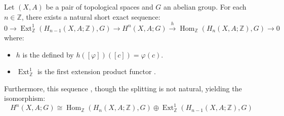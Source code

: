 \begin{theorem} \label{theorem:universal_coefficient_theorem_for_singular_cohomology_of_topological_spaces_with_coefficients_in_abelian_groups}
Let $(X, A)$ be a pair of topological spaces and $G$ an abelian group. For each $n \in \mathbb{Z}$, there exists a natural short exact sequence:
$$0 \to \operatorname{Ext}_{\mathbb{Z}}^1(H_{n-1}(X, A; \mathbb{Z}), G) \to H^n(X, A; G) \xrightarrow{h} \operatorname{Hom}_{\mathbb{Z}}(H_n(X, A; \mathbb{Z}), G) \to 0$$
where:
\begin{itemize}
    \item $h$ is the  defined by $h([\varphi])([c]) = \varphi(c)$.
    \item $\operatorname{Ext}_{\mathbb{Z}}^1$ is the first extension product functor .
\end{itemize}
Furthermore, this sequence , though the splitting is not natural, yielding the isomorphism:
$$H^n(X, A; G) \cong \operatorname{Hom}_{\mathbb{Z}}(H_n(X, A; \mathbb{Z}), G) \oplus \operatorname{Ext}_{\mathbb{Z}}^1(H_{n-1}(X, A; \mathbb{Z}), G)$$
\end{theorem}